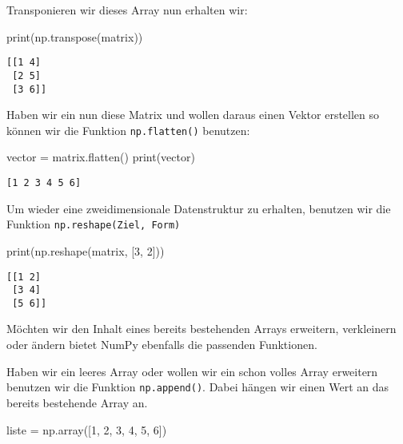 \documentclass[
  letterpaper,
  DIV=11,
  numbers=noendperiod]{scrreprt}
\newenvironment{Shaded}{\begin{snugshade}}{\end{snugshade}}
\newcommand{\BuiltInTok}[1]{\textcolor[rgb]{0.00,0.23,0.31}{#1}}
\newcommand{\DecValTok}[1]{\textcolor[rgb]{0.68,0.00,0.00}{#1}}
\newcommand{\NormalTok}[1]{\textcolor[rgb]{0.00,0.23,0.31}{#1}}
\newcommand{\OperatorTok}[1]{\textcolor[rgb]{0.37,0.37,0.37}{#1}}
\begin{document}
\begin{tcolorbox}
Transponieren wir dieses Array nun erhalten wir:

\begin{Shaded}
\begin{Highlighting}[]
\BuiltInTok{print}\NormalTok{(np.transpose(matrix))}
\end{Highlighting}
\end{Shaded}

\begin{verbatim}
[[1 4]
 [2 5]
 [3 6]]
\end{verbatim}

Haben wir ein nun diese Matrix und wollen daraus einen Vektor erstellen
so können wir die Funktion \texttt{np.flatten()} benutzen:

\begin{Shaded}
\begin{Highlighting}[]
\NormalTok{vector }\OperatorTok{=}\NormalTok{ matrix.flatten()}
\BuiltInTok{print}\NormalTok{(vector)}
\end{Highlighting}
\end{Shaded}

\begin{verbatim}
[1 2 3 4 5 6]
\end{verbatim}

Um wieder eine zweidimensionale Datenstruktur zu erhalten, benutzen wir
die Funktion \texttt{np.reshape(Ziel,\ Form)}

\begin{Shaded}
\begin{Highlighting}[]
\BuiltInTok{print}\NormalTok{(np.reshape(matrix, [}\DecValTok{3}\NormalTok{, }\DecValTok{2}\NormalTok{]))}
\end{Highlighting}
\end{Shaded}

\begin{verbatim}
[[1 2]
 [3 4]
 [5 6]]
\end{verbatim}

Möchten wir den Inhalt eines bereits bestehenden Arrays erweitern,
verkleinern oder ändern bietet NumPy ebenfalls die passenden Funktionen.

Haben wir ein leeres Array oder wollen wir ein schon volles Array
erweitern benutzen wir die Funktion \texttt{np.append()}. Dabei hängen
wir einen Wert an das bereits bestehende Array an.

\begin{Shaded}
\begin{Highlighting}[]
\NormalTok{liste }\OperatorTok{=}\NormalTok{ np.array([}\DecValTok{1}\NormalTok{, }\DecValTok{2}\NormalTok{, }\DecValTok{3}\NormalTok{, }\DecValTok{4}\NormalTok{, }\DecValTok{5}\NormalTok{, }\DecValTok{6}\NormalTok{])}


\end{Highlighting}
\end{Shaded}
\end{tcolorbox}
\end{document}
